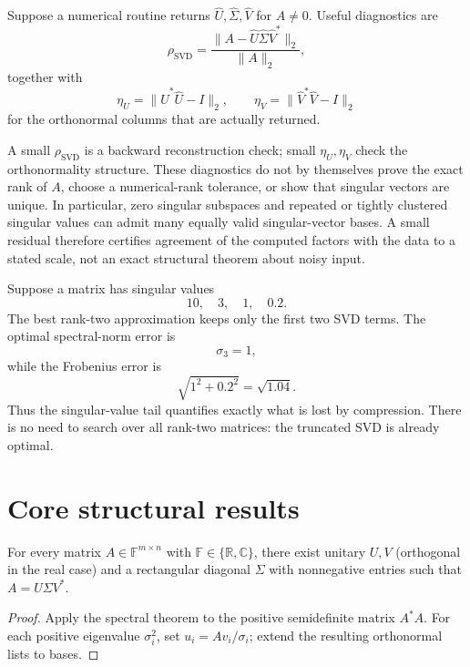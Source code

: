 \begin{remark}
Suppose a numerical routine returns
\(\widehat U,\widehat\Sigma,\widehat V\) for \(A\neq0\).  Useful diagnostics are
\[
\rho_{\mathrm{SVD}}
=
\frac{\|A-\widehat U\widehat\Sigma\widehat V^*\|_2}{\|A\|_2},
\]
together with
\[
\eta_U=\|\widehat U^*\widehat U-I\|_2,
\qquad
\eta_V=\|\widehat V^*\widehat V-I\|_2
\]
for the orthonormal columns that are actually returned.

A small \(\rho_{\mathrm{SVD}}\) is a backward reconstruction check; small
\(\eta_U,\eta_V\) check the orthonormality structure.  These diagnostics do not
by themselves prove the exact rank of \(A\), choose a numerical-rank tolerance,
or show that singular vectors are unique.  In particular, zero singular
subspaces and repeated or tightly clustered singular values can admit many
equally valid singular-vector bases.  A small residual therefore certifies
agreement of the computed factors with the data to a stated scale, not an
exact structural theorem about noisy input.
\end{remark}


\begin{example}\label{ex:i18-expand-03}
Suppose a matrix has singular values
\[
10,\quad 3,\quad 1,\quad 0.2.
\]
The best rank-two approximation keeps only the first two SVD terms. The optimal
spectral-norm error is
\[
\sigma_3=1,
\]
while the Frobenius error is
\[
\sqrt{1^2+0.2^2}=\sqrt{1.04}.
\]
Thus the singular-value tail quantifies exactly what is lost by compression.
There is no need to search over all rank-two matrices: the truncated SVD is
already optimal.
\end{example}
\section{Core structural results}

\begin{theorem}\label{thm:i18-01}
For every matrix $A\in\mathbb F^{m\times n}$ with $\mathbb F\in\{\mathbb R,\mathbb C\}$, there exist unitary $U,V$ (orthogonal in the real case) and a rectangular diagonal $\Sigma$ with nonnegative entries such that $A=U\Sigma V^*$.
\begin{proof}
Apply the spectral theorem to the positive semidefinite matrix $A^*A$. For each positive eigenvalue $\sigma_i^2$, set $u_i=Av_i/\sigma_i$; extend the resulting orthonormal lists to bases.
\end{proof}
\end{theorem}

